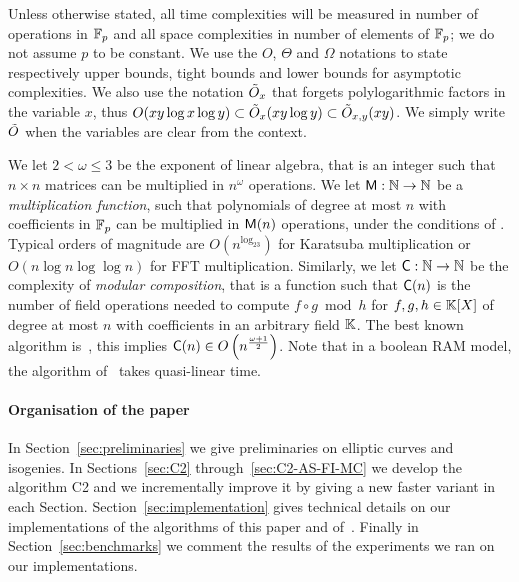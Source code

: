 Unless otherwise stated, all time complexities will be measured in
number of operations in $\mathbb{F}_p$ and all space complexities in number of
elements of $\mathbb{F}_p$; we do not assume $p$ to be constant. We use the
$O$, $\Theta$ and $\Omega$ notations to state respectively upper
bounds, tight bounds and lower bounds for asymptotic complexities. We
also use the notation $\tilde{O}_x$ that forgets polylogarithmic factors
in the variable $x$, thus $O(xy\log x \log y)\subset\tilde{O}_x(xy\log
y)\subset\tilde{O}_{x,y}(xy)$. We simply write $\tilde{O}$ when the variables
are clear from the context.

We let $2<\omega\le3$ be the exponent of linear algebra, that is an
integer such that $n\times n$ matrices can be multiplied in $n^\omega$
operations. We let $\mathrm{\sf M}:\mathbb{N}\rightarrow\mathbb{N}$ be a \emph{multiplication
  function}, such that polynomials of degree at most $n$ with
coefficients in $\mathbb{F}_p$ can be multiplied in $\mathrm{\sf M}(n)$ operations,
under the conditions of \cite[Ch. 8.3]{vzGG}. Typical orders of
magnitude are $O(n^{\log_23})$ for Karatsuba multiplication or
$O(n\log n\log\log n)$ for FFT multiplication. Similarly, we let
$\mathrm{\sf C}:\mathbb{N}\rightarrow\mathbb{N}$ be the complexity of \emph{modular
  composition}, that is a function such that $\mathrm{\sf C}(n)$ is the
number of field operations needed to compute $f\circ g\bmod h$ for
$f,g,h\in\mathbb{K}[X]$ of degree at most $n$ with coefficients in an
arbitrary field $\mathbb{K}$. The best known algorithm is~\cite{BrKu78}, this
implies $\mathrm{\sf C}(n)\in O\left(n^{\frac{\omega+1}{2}}\right)$. Note
that in a boolean RAM model, the algorithm of~\cite{KeUm08} takes
quasi-linear time.

\paragraph{Organisation of the paper}
In Section~\ref{sec:preliminaries} we give preliminaries on elliptic
curves and isogenies. In Sections~\ref{sec:C2}
through~\ref{sec:C2-AS-FI-MC} we develop the algorithm C2 and we
incrementally improve it by giving a new faster variant in each
Section. Section~\ref{sec:implementation} gives technical details on
our implementations of the algorithms of this paper and
of~\cite{LeSi09}. Finally in Section~\ref{sec:benchmarks} we comment
the results of the experiments we ran on our implementations.



%
